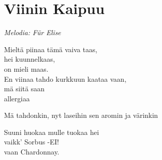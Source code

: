 \section{Viinin Kaipuu}
\vspace{-0.2cm}
\textit{Melodia: Für Elise}

Mieltä piinaa tämä vaiva taas,\\
hei kuunnelkaas,\\
on mieli maas.\\
En viinaa tahdo kurkkuun kaataa vaan,\\
mä siitä saan\\
allergiaa

Mä tahdonkin, nyt laseihin sen aromin ja värinkin

Suuni huokaa mulle tuokaa hei\\
vaikk' Sorbus -EI!\\
vaan Chardonnay.